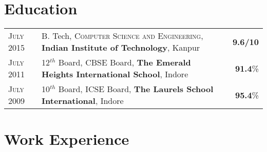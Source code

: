 \documentclass[a4paper]{article} %
\begin{document}

\section{Education}
\def\arraystretch{1.2}
\begin{tabular}{>{\raggedleft}p{1.5cm}p{14.6cm}r}

    \textsc{July 2015} & B. Tech, \textsc{Computer Science and Engineering},
    \textbf{Indian Institute of Technology}, Kanpur
    & \textbf{9.6/10}\\

    \textsc{July 2011} & 12$^{th}$ Board, \textsc{CBSE} Board,
    \textbf{The Emerald Heights International School}, Indore
    & \textbf{91.4}\% \\

    \textsc{July 2009} & 10$^{th}$ Board, \textsc{ICSE} Board,
    \textbf{The Laurels School International}, Indore
    & \textbf{95.4}\% \\

\end{tabular}
\def\arraystretch{1}



%
\section{Work Experience}
\end{document}
